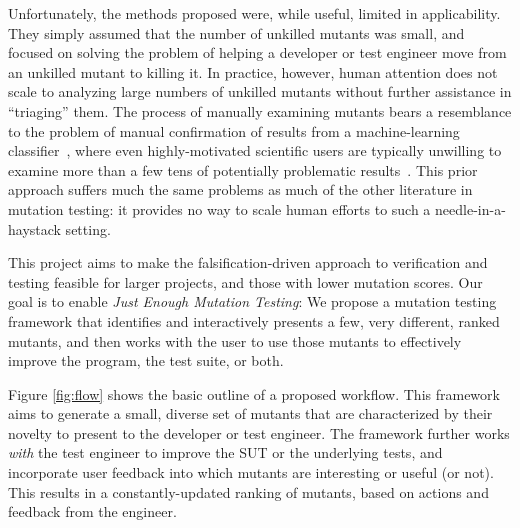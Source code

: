 Unfortunately, the
methods proposed were, while useful, limited in applicability.  They simply assumed that the number of unkilled mutants was
small, and focused on solving the problem of helping a developer or
test engineer move from an unkilled mutant to killing it.
In practice, however, human
attention does not scale to analyzing large numbers of
unkilled mutants without further assistance in ``triaging'' them.  The process of manually examining mutants bears a
resemblance to the problem of manual confirmation of results from a
machine-learning classifier~\cite{OnlyOracle,EndUserMistake}, where even highly-motivated scientific
users are typically unwilling to examine more than a few tens of
potentially problematic results~\cite{Segal}.
This prior approach suffers much the same problems as much of the other
literature in mutation testing: it provides no way to
scale human efforts to such a needle-in-a-haystack setting.

This project aims to make the falsification-driven approach to verification and testing feasible for larger
projects, and those with lower mutation scores.
Our goal is to enable \emph{Just Enough Mutation Testing}: We propose a mutation
testing framework that identifies and interactively presents a few, very
different, ranked mutants, and then works with the user to use those mutants to
effectively improve the program, the test suite, or both.

Figure \ref{fig:flow} shows the basic outline of a proposed workflow.
%
This framework aims to generate a small, diverse set of
mutants that are characterized by their novelty to present to the developer or
test engineer.  The framework further works
 \emph{with} the test engineer to improve the SUT or
the underlying tests, and incorporate user feedback into which mutants are
interesting or useful (or not).  This results in a constantly-updated ranking of mutants,
based on actions and feedback from the engineer.

